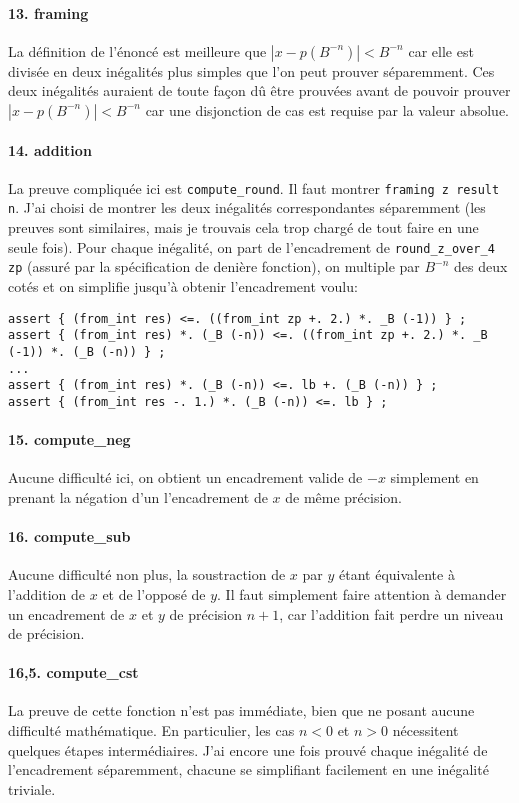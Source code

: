 \documentclass[a4paper]{article}%
\begin{document}
	\paragraph{13. framing} La définition de l'énoncé est meilleure que $|x - p(B^{-n})| < B^{-n}$ car elle
	est divisée en deux inégalités plus simples que l'on peut prouver séparemment.
	Ces deux inégalités auraient de toute façon dû être prouvées avant de pouvoir prouver $|x - p(B^{-n})| < B^{-n}$
	car une disjonction de cas est requise par la valeur absolue.

	\paragraph{14. addition} La preuve compliquée ici est \texttt{compute_round}.
	Il faut montrer \texttt{framing z result n}. J'ai choisi de montrer les deux inégalités
	correspondantes séparemment (les preuves sont similaires, mais je trouvais cela trop chargé de tout faire
	en une seule fois). Pour chaque inégalité, on part de l'encadrement de \texttt{round_z_over_4 zp}
	(assuré par la spécification de denière fonction), on multiple par $B^{-n}$ des deux cotés et on simplifie
	jusqu'à obtenir l'encadrement voulu:
	\begin{verbatim}
assert { (from_int res) <=. ((from_int zp +. 2.) *. _B (-1)) } ;
assert { (from_int res) *. (_B (-n)) <=. ((from_int zp +. 2.) *. _B (-1)) *. (_B (-n)) } ;
...
assert { (from_int res) *. (_B (-n)) <=. lb +. (_B (-n)) } ;
assert { (from_int res -. 1.) *. (_B (-n)) <=. lb } ;
	\end{verbatim}

	\paragraph{15. compute\_neg} Aucune difficulté ici, on obtient un encadrement valide de $-x$ simplement
	en prenant la négation d'un l'encadrement de $x$ de même précision.

	\paragraph{16. compute\_sub} Aucune difficulté non plus, la soustraction de $x$ par $y$
	étant équivalente à l'addition de $x$ et de l'opposé de $y$. Il faut simplement faire attention à
	demander un encadrement de $x$ et $y$ de précision $n+1$, car l'addition fait perdre un niveau de précision.

	\paragraph{16,5. compute\_cst} La preuve de cette fonction n'est pas immédiate, bien que ne posant aucune difficulté mathématique.
	En particulier, les cas $n<0$ et $n>0$ nécessitent quelques étapes intermédiaires.
	J'ai encore une fois prouvé chaque inégalité de l'encadrement séparemment, chacune se simplifiant facilement en une inégalité triviale.
\end{document}
